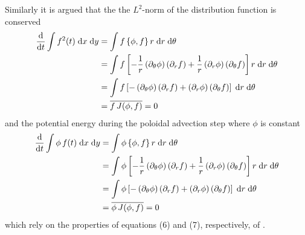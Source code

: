 Similarly it is argued that the the $L^2$-norm of the distribution function is conserved
\begin{subequations}
	\begin{align}
		\frac{\text{d}}{\text{d} t} \int f^2(t) \;\text{d} x \;\text{d} y & = \int f \left\{ \phi, f \right\}r \;\text{d} r \;\text{d} \theta \\
		& = \int f \left[- \frac{1}{r} \left(\partial_\theta\phi\right) \left(\partial_r f\right) + \frac{1}{r} \left(\partial_r\phi\right) \left(\partial_\theta f\right)\right] r \;\text{d} r \;\text{d} \theta \\
		& = \int f \left[- \left(\partial_\theta\phi\right) \left(\partial_r f\right) + \left(\partial_r\phi\right) \left(\partial_\theta f\right)\right] \;\text{d} r \;\text{d} \theta \\
		& = \overline{f \, J(\phi,f)} = 0
	\end{align}
\end{subequations}
and the potential energy during the poloidal advection step where $\phi$ is constant
\begin{subequations}
	\begin{align}
		\frac{\text{d}}{\text{d} t} \int \phi \, f(t) \;\text{d} x \;\text{d} y & = \int \phi \left\{ \phi, f \right\}r \;\text{d} r \;\text{d} \theta \\
		& = \int \phi \left[- \frac{1}{r} \left(\partial_\theta\phi\right) \left(\partial_r f\right) + \frac{1}{r} \left(\partial_r\phi\right) \left(\partial_\theta f\right)\right] r \;\text{d} r \;\text{d} \theta \\
		& = \int \phi \left[- \left(\partial_\theta\phi\right) \left(\partial_r f\right) + \left(\partial_r\phi\right) \left(\partial_\theta f\right)\right] \;\text{d} r \;\text{d} \theta \\
		& = \overline{\phi \, J(\phi,f)} = 0
	\end{align}
\end{subequations}
which rely on the properties of equations (6) and (7), respectively, of \cite{Arakawa_1966}.

